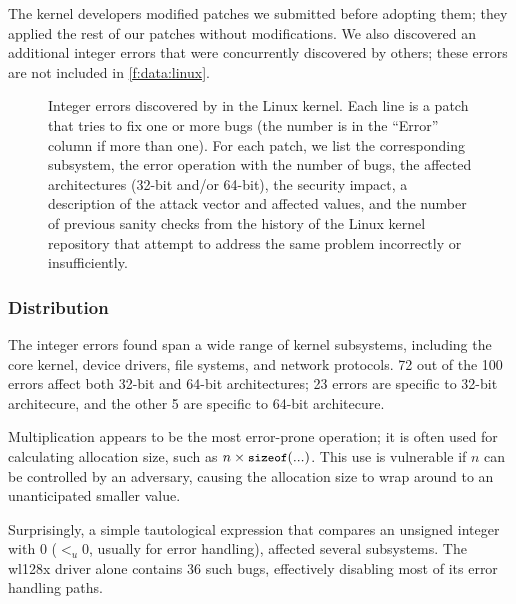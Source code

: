 The kernel developers modified \nrpatchesmod patches we submitted
before adopting them; they applied the rest of our patches without
modifications.
%
We also discovered an additional \nrbugsbyothers integer errors that
were concurrently discovered by others; these errors are not included
in \autoref{f:data:linux}.

\begin{figure*}
\centering
\footnotesize

\caption{Integer errors discovered by \sys in the Linux
kernel.  Each line is a patch that tries to fix one
or more bugs (the number is in the ``Error'' column if more than
one).  For each patch, we list the corresponding subsystem, the
error operation with the number of bugs, the affected architectures
(32-bit and/or 64-bit), the security impact, a
description of the attack vector and affected values, and
the number of previous sanity checks from the history of the 
Linux kernel repository that attempt to address the same problem
incorrectly or insufficiently. }
\label{f:data:linux}
\end{figure*}

\subsubsection{Distribution}

The integer errors \sys found span a wide range of kernel subsystems,
including the core kernel, device drivers, file systems, and network
protocols.
72 out of the 100 errors affect both 32-bit and 64-bit architectures;
23 errors are specific to 32-bit architecure, and the other 5 are 
specific to 64-bit architecure.

Multiplication appears to be the most error-prone operation; it is
often used for calculating allocation size, such as $n \times
\cc{sizeof}(...)$.  This use is vulnerable if $n$ can be controlled
by an adversary, causing the allocation size to wrap around to an
unanticipated smaller value.

Surprisingly,  a simple tautological expression that 
compares an unsigned integer with 0 ($<_u 0$, usually for error handling),
affected several subsystems.
The wl128x driver alone contains 36 such bugs, effectively
disabling most of its error handling paths.

